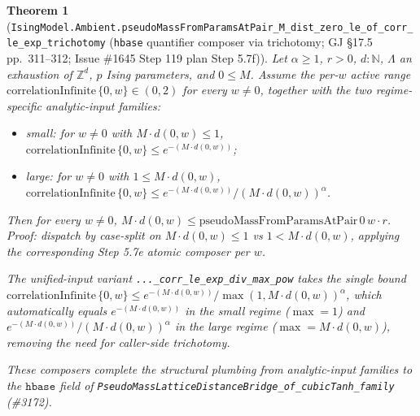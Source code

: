 \documentclass[a4paper,11pt]{article}
\newtheorem{theorem}{Theorem}
\begin{document}
\begin{theorem}[\texttt{IsingModel.Ambient.pseudoMassFromParamsAtPair\_M\_dist\_zero\_le\_of\_corr\_le\_exp\_trichotomy}
(\texttt{hbase} quantifier composer via trichotomy;
GJ \S17.5 pp.~311--312; Issue \#1645 Step 119 plan Step 5.7f)]
Let $\alpha \ge 1$, $r > 0$, $d : \mathbb{N}$, $\Lambda$ an exhaustion of
$\mathbb{Z}^d$, $p$ Ising parameters, and $0 \le M$. Assume the per-$w$
active range
$\mathrm{correlationInfinite}\,\{0,w\} \in (0, 2)$ for every $w \ne 0$,
together with the two regime-specific analytic-input families:
\begin{itemize}
  \item small: for $w \ne 0$ with $M \cdot d(0, w) \le 1$,
    $\mathrm{correlationInfinite}\,\{0,w\} \le e^{-(M \cdot d(0, w))}$;
  \item large: for $w \ne 0$ with $1 \le M \cdot d(0, w)$,
    $\mathrm{correlationInfinite}\,\{0,w\} \le
    e^{-(M \cdot d(0, w))} / (M \cdot d(0, w))^\alpha$.
\end{itemize}
Then for every $w \ne 0$,
$M \cdot d(0, w) \le \mathrm{pseudoMassFromParamsAtPair}\,0\,w \cdot r$.
Proof: dispatch by case-split on $M \cdot d(0, w) \le 1$ vs $1 < M \cdot d(0, w)$,
applying the corresponding Step 5.7e atomic composer per $w$.

The unified-input variant
\texttt{...\_corr\_le\_exp\_div\_max\_pow} takes the single bound
$\mathrm{correlationInfinite}\,\{0,w\} \le
e^{-(M \cdot d(0, w))} / \max(1, M \cdot d(0, w))^\alpha$,
which automatically equals $e^{-(M \cdot d(0, w))}$ in the small regime
($\max = 1$) and $e^{-(M \cdot d(0, w))} / (M \cdot d(0, w))^\alpha$ in the
large regime ($\max = M \cdot d(0, w)$), removing the need for caller-side
trichotomy.

These composers complete the structural plumbing from analytic-input families
to the $\mathtt{hbase}$ field of
\texttt{PseudoMassLatticeDistanceBridge\_of\_cubicTanh\_family} (\#3172).
\end{theorem}
\end{document}
